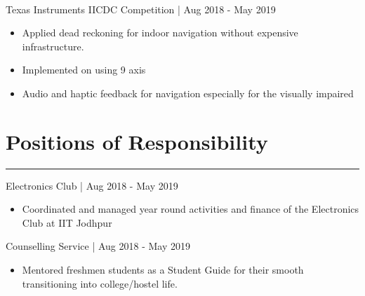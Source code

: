 \documentclass[]{resume}
\begin{document}
\begin{minipage}[t]{0.66\textwidth}
\vspace{-0.5em}
\hspace{1em}
\\
\hspace*{1em}Texas Instruments IICDC Competition | Aug 2018 - May 2019\\ 
\vspace{-2em}
\descript{}
\begin{itemize}
    \item Applied dead reckoning for indoor navigation without expensive infrastructure.
    \vspace{-0.6em}\\
    \item Implemented on  using 9 axis 
    \vspace{-0.6em}\\
    \item Audio and haptic feedback for navigation especially for the visually impaired
\end{itemize}
\sectionsep


\vspace{-1.5em}

\section{Positions of Responsibility}
\vspace{-0.5em}
\noindent\rule{12.5cm}{0.4pt}

\vspace{0.2em}
\hspace{1em}
 Electronics Club | Aug 2018 - May 2019\\
\vspace{-2em}
\descript{}
\begin{itemize}
    \item Coordinated and managed year round activities and finance of the Electronics Club at IIT Jodhpur
\end{itemize}

\vspace{-0.4em}
\hspace{1em}%
 Counselling Service | Aug 2018 - May 2019\\
\vspace{-2em}
\descript{}
\begin{itemize}
    \item Mentored freshmen students as a Student Guide for their smooth transitioning into college/hostel life.
\end{itemize}



\end{minipage}
\end{document}
